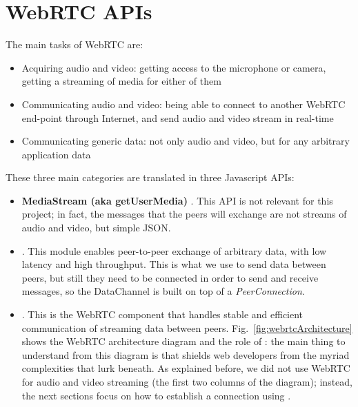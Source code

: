 \section{WebRTC APIs}
\label{sec:webrtc_api}
The main tasks of WebRTC are:
\begin{itemize}
	\item Acquiring audio and video: getting access to the microphone or camera, getting a streaming of media for either of them
	\item Communicating audio and video: being able to connect to another WebRTC end-point through Internet, and send audio and video stream in real-time
	\item Communicating generic data: not only audio and video, but for any arbitrary application data
\end{itemize}
These three main categories are translated in three Javascript APIs:
\begin{itemize}
	\item\textbf{\textsf{MediaStream} (aka getUserMedia) }.
This API is not relevant for this project; in fact, the messages that the peers will exchange are not streams of audio and video, but simple JSON.
	\item\textbf{\RTCPeerConnection}.
This module enables peer-to-peer exchange of arbitrary data, with low latency and high throughput. This is what we use to send data between peers, but still they need to be connected in order to send and receive messages, so the DataChannel is built on top of a \textit{PeerConnection}.
	\item\textbf{\RTCDataChannel}.
This is the WebRTC component that handles stable and efficient communication of streaming data between peers. Fig.~\ref{fig:webrtcArchitecture} shows the WebRTC architecture diagram and the role of \RTCPeerConnection: the main thing to understand from this diagram is that \RTCPeerConnection shields web developers from the myriad complexities that lurk beneath. As explained before, we did not use WebRTC for audio and video streaming (the first two columns of the diagram); instead, the next sections focus on how to establish a connection using \RTCPeerConnection.
\end{itemize}

